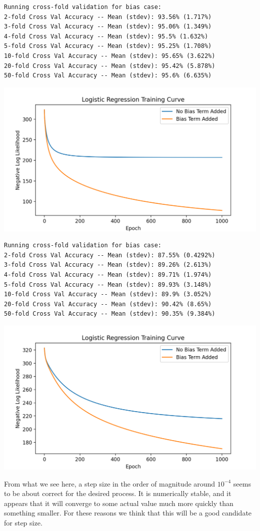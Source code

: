 \documentclass{article}
\theoremstyle{definition}
\begin{document}
\begin{mdframed}[]
    \begin{verbatim}
Running cross-fold validation for bias case:
2-fold Cross Val Accuracy -- Mean (stdev): 93.56% (1.717%)
3-fold Cross Val Accuracy -- Mean (stdev): 95.06% (1.349%)
4-fold Cross Val Accuracy -- Mean (stdev): 95.5% (1.632%)
5-fold Cross Val Accuracy -- Mean (stdev): 95.25% (1.708%)
10-fold Cross Val Accuracy -- Mean (stdev): 95.65% (3.622%)
20-fold Cross Val Accuracy -- Mean (stdev): 95.42% (5.878%)
50-fold Cross Val Accuracy -- Mean (stdev): 95.6% (6.635%)
    \end{verbatim}
    \includegraphics[scale=0.75]{figures/step_size_0.0001.png}
\end{mdframed}
\begin{mdframed}[]
    \begin{verbatim}
Running cross-fold validation for bias case:
2-fold Cross Val Accuracy -- Mean (stdev): 87.55% (0.4292%)
3-fold Cross Val Accuracy -- Mean (stdev): 89.26% (2.613%)
4-fold Cross Val Accuracy -- Mean (stdev): 89.71% (1.974%)
5-fold Cross Val Accuracy -- Mean (stdev): 89.93% (3.148%)
10-fold Cross Val Accuracy -- Mean (stdev): 89.9% (3.052%)
20-fold Cross Val Accuracy -- Mean (stdev): 90.42% (8.65%)
50-fold Cross Val Accuracy -- Mean (stdev): 90.35% (9.384%)
    \end{verbatim}
    \includegraphics[scale=0.75]{figures/step_size_0.00001.png}
\end{mdframed}
From what we see here, a step size in the order of magnitude around $10^{-4}$ seems to
be about correct for the desired process. It is numerically stable, and it appears that 
it will converge to some actual value much more quickly than something smaller.
For these reasons we think that this will be a good candidate for step size.
\end{document}

